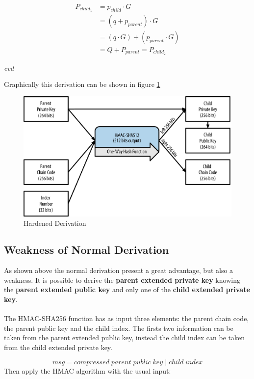 \begin{equation*} \label{eq2}
\begin{split}
P_{child_1} & = p_{child} \cdot G \\
& = (q+p_{parent}) \cdot G \\
& = (q \cdot G) + (p_{parent}\cdot G) \\
& = Q + P_{parent} = P_{child_2}
\end{split}
\end{equation*}
\begin{flushright}
	\textit{cvd}
\end{flushright}
Graphically this derivation can be shown in figure \ref{fig:pubtopub}
\begin{figure}[ht!]
	\centering
	\includegraphics[width=15cm]{Figures/hardened_derivation.png} %
	\caption{Hardened Derivation }
	\label{fig:pubtopub}
\end{figure}

\subsection{Weakness of Normal Derivation}
As shown above the normal derivation present a great advantage, but also a weakness. It is possible to derive the \textbf{parent extended private key} knowing the \textbf{parent extended public key} and only one of the \textbf{child extended private key}.
\\ \\
The HMAC-SHA256 function has as input three elements: the parent chain code, the parent public key and the child index. The firsts two information can be taken from the parent extended public key, instead the child index can be taken from the child extended private key.

\begin{equation*}
msg = compressed \;parent\; public\;key \;|\;child\; index
\end{equation*}
Then apply the HMAC algorithm with the usual input:

